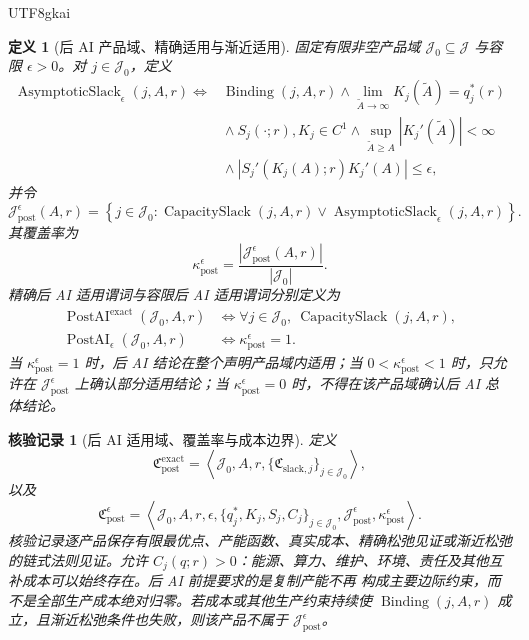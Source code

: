 \documentclass[12pt,a4paper,openany]{report}
\newtheorem{definition}{定义}[chapter]
\newtheorem{Certificate}{核验记录}[chapter]
\newcommand{\Goods}{\mathcal J}
\newcommand{\Abs}[1]{\left\lvert #1\right\rvert}
\newcommand{\Tuple}[1]{\left\langle #1\right\rangle}
\DeclareMathOperator{\CapacitySlack}{CapacitySlack}
\DeclareMathOperator{\AsymptoticSlack}{AsymptoticSlack}
\DeclareMathOperator{\PostAI}{PostAI}
\DeclareMathOperator{\Binding}{Binding}
\begin{document}
\begin{CJK*}{UTF8}{gkai}
\begin{definition}[后 AI 产品域、精确适用与渐近适用]
\label{def:post-ai-applicability}
固定有限非空产品域 \(\Goods_0\subseteq\Goods\) 与容限 \(\epsilon>0\)。对 \(j\in\Goods_0\)，定义
\[
\begin{aligned}
  \AsymptoticSlack_\epsilon(j,A,r)
  \Longleftrightarrow{}&
  \Binding(j,A,r)
  \wedge
  \lim_{\widetilde A\to\infty}K_j(\widetilde A)=q_j^*(r)\\
  &{}\wedge S_j(\cdot;r),K_j\in C^1
  \wedge
  \sup_{\widetilde A\ge A}\Abs{K_j'(\widetilde A)}<\infty\\
  &{}\wedge
  \Abs{S_j'(K_j(A);r)K_j'(A)}\le\epsilon,
\end{aligned}
\]
并令
\[
  \Goods_{\mathrm{post}}^\epsilon(A,r)
  =
  \left\{
  j\in\Goods_0:
  \CapacitySlack(j,A,r)
  \vee
  \AsymptoticSlack_\epsilon(j,A,r)
  \right\}.
\]
其覆盖率为
\[
  \kappa_{\mathrm{post}}^\epsilon
  =
  \frac{\Abs{\Goods_{\mathrm{post}}^\epsilon(A,r)}}{\Abs{\Goods_0}}.
\]
精确后 AI 适用谓词与容限后 AI 适用谓词分别定义为
\[
\begin{aligned}
  \PostAI^{\mathrm{exact}}(\Goods_0,A,r)
  &\Longleftrightarrow
  \forall j\in\Goods_0,\ \CapacitySlack(j,A,r),\\
  \PostAI_\epsilon(\Goods_0,A,r)
  &\Longleftrightarrow
  \kappa_{\mathrm{post}}^\epsilon=1.
\end{aligned}
\]
当 \(\kappa_{\mathrm{post}}^\epsilon=1\) 时，后 AI 结论在整个声明产品域内适用；当
\(0<\kappa_{\mathrm{post}}^\epsilon<1\) 时，只允许在
\(\Goods_{\mathrm{post}}^\epsilon\) 上确认部分适用结论；当
\(\kappa_{\mathrm{post}}^\epsilon=0\) 时，不得在该产品域确认后 AI 总体结论。
\end{definition}

\begin{Certificate}[后 AI 适用域、覆盖率与成本边界]
\label{cert:post-ai-applicability}
定义
\[
  \mathfrak C_{\mathrm{post}}^{\mathrm{exact}}
  =
  \Tuple{
  \Goods_0,A,r,
  \{\mathfrak C_{\mathrm{slack},j}\}_{j\in\Goods_0}
  },
\]
以及
\[
  \mathfrak C_{\mathrm{post}}^\epsilon
  =
  \Tuple{
  \Goods_0,A,r,\epsilon,
  \{q_j^*,K_j,S_j,C_j\}_{j\in\Goods_0},
  \Goods_{\mathrm{post}}^\epsilon,
  \kappa_{\mathrm{post}}^\epsilon
  }.
\]
核验记录逐产品保存有限最优点、产能函数、真实成本、精确松弛见证或渐近松弛的链式法则见证。允许
\(C_j(q;r)>0\)：能源、算力、维护、环境、责任及其他互补成本可以始终存在。后 AI 前提要求的是复制产能不再
构成主要边际约束，而不是全部生产成本绝对归零。若成本或其他生产约束持续使
\(\Binding(j,A,r)\) 成立，且渐近松弛条件也失败，则该产品不属于
\(\Goods_{\mathrm{post}}^\epsilon\)。
\end{Certificate}


\end{CJK*}
\end{document}
